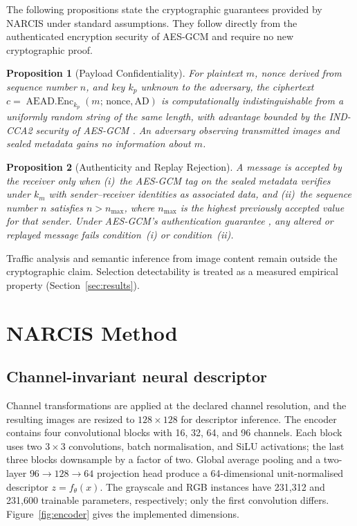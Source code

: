 ﻿\documentclass[a4paper,fleqn]{cas-dc}
\newtheorem{proposition}{Proposition}
\newcommand{\method}{NARCIS\xspace}
\begin{document}
The following propositions state the cryptographic guarantees provided by
\method under standard assumptions. They follow directly from the
authenticated encryption security of AES-GCM \cite{nist2007gcm} and
require no new cryptographic proof.

\begin{proposition}[Payload Confidentiality]
\label{prop:conf}
For plaintext $m$, nonce derived from sequence number $n$, and key $k_p$
unknown to the adversary, the ciphertext
$c = \operatorname{AEAD.Enc}_{k_p}(m;\,\mathrm{nonce},\mathrm{AD})$
is computationally indistinguishable from a uniformly random string of
the same length, with advantage bounded by the IND-CCA2 security of
AES-GCM \cite{nist2007gcm}. An adversary observing transmitted images
and sealed metadata gains no information about $m$.
\end{proposition}

\begin{proposition}[Authenticity and Replay Rejection]
\label{prop:auth}
A message is accepted by the receiver only when
(i)~the AES-GCM tag on the sealed metadata verifies under $k_m$
    with sender--receiver identities as associated data, and
(ii)~the sequence number $n$ satisfies $n > n_{\max}$, where $n_{\max}$
    is the highest previously accepted value for that sender.
Under AES-GCM's authentication guarantee \cite{nist2007gcm}, any
altered or replayed message fails condition~(i) or condition~(ii).
\end{proposition}

\noindent
Traffic analysis and semantic inference from image content remain outside
the cryptographic claim. Selection detectability is treated as a measured
empirical property (Section~\ref{sec:results}).

\section{NARCIS Method}
\label{sec:method}

\subsection{Channel-invariant neural descriptor}

Channel transformations are applied at the declared channel resolution, and
the resulting images are resized to $128\times128$ for descriptor inference.
The encoder contains four convolutional blocks with 16, 32, 64, and 96
channels. Each block uses two $3\times3$ convolutions, batch normalisation,
and SiLU activations; the last three blocks downsample by a factor of two.
Global average pooling and a two-layer $96\rightarrow128\rightarrow64$
projection head produce a 64-dimensional unit-normalised descriptor
$z=f_\theta(x)$. The grayscale and RGB instances have 231,312 and 231,600
trainable parameters, respectively; only the first convolution differs.
Figure~\ref{fig:encoder} gives the implemented dimensions.
\end{document}
